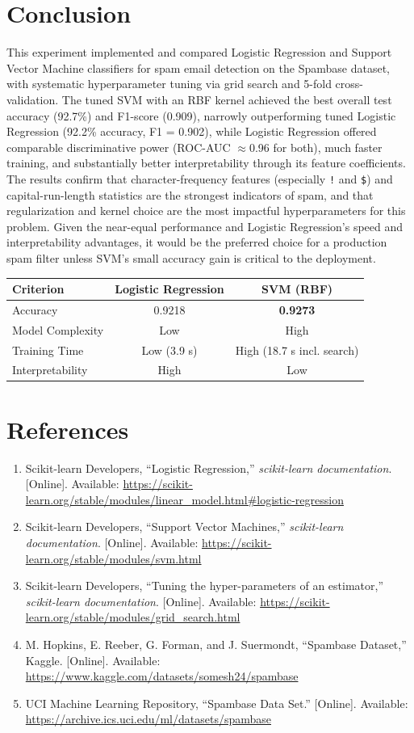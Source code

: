 \documentclass[12pt,a4paper]{article}
\begin{document}
\section{Conclusion}
This experiment implemented and compared Logistic Regression and Support
Vector Machine classifiers for spam email detection on the Spambase dataset,
with systematic hyperparameter tuning via grid search and 5-fold
cross-validation. The tuned SVM with an RBF kernel achieved the best overall
test accuracy (92.7\%) and F1-score (0.909), narrowly outperforming tuned
Logistic Regression (92.2\% accuracy, F1 = 0.902), while Logistic Regression
offered comparable discriminative power (ROC-AUC $\approx$0.96 for both),
much faster training, and substantially better interpretability through its
feature coefficients. The results confirm that character-frequency features
(especially \texttt{!} and \texttt{\$}) and capital-run-length statistics are
the strongest indicators of spam, and that regularization and kernel choice
are the most impactful hyperparameters for this problem. Given the near-equal
performance and Logistic Regression's speed and interpretability advantages,
it would be the preferred choice for a production spam filter unless SVM's
small accuracy gain is critical to the deployment.

\begin{tabular}{lcc}
\toprule
Criterion & Logistic Regression & SVM (RBF)\\
\midrule
Accuracy & 0.9218 & \textbf{0.9273} \\
Model Complexity & Low & High \\
Training Time & Low (3.9 s) & High (18.7 s incl. search) \\
Interpretability & High & Low \\
\bottomrule
\end{tabular}

\section{References}
\begin{enumerate}
\item Scikit-learn Developers, ``Logistic Regression,'' \textit{scikit-learn documentation}. [Online]. Available: \url{https://scikit-learn.org/stable/modules/linear_model.html#logistic-regression}
\item Scikit-learn Developers, ``Support Vector Machines,'' \textit{scikit-learn documentation}. [Online]. Available: \url{https://scikit-learn.org/stable/modules/svm.html}
\item Scikit-learn Developers, ``Tuning the hyper-parameters of an estimator,'' \textit{scikit-learn documentation}. [Online]. Available: \url{https://scikit-learn.org/stable/modules/grid_search.html}
\item M. Hopkins, E. Reeber, G. Forman, and J. Suermondt, ``Spambase Dataset,'' Kaggle. [Online]. Available: \url{https://www.kaggle.com/datasets/somesh24/spambase}
\item UCI Machine Learning Repository, ``Spambase Data Set.'' [Online]. Available: \url{https://archive.ics.uci.edu/ml/datasets/spambase}
\end{enumerate}
\end{document}
